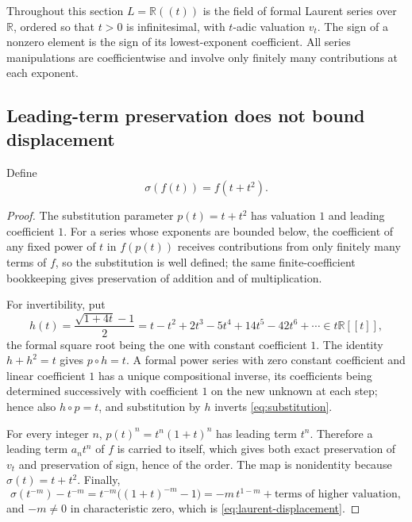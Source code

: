 \documentclass[11pt]{article}
\newtheorem{proposition}[theorem]{Proposition}
\theoremstyle{definition}
\theoremstyle{remark}
\newcommand{\R}{\mathbb{R}}
\numberwithin{equation}{section}
\begin{document}
Throughout this section $L=\R((t))$ is the field of formal Laurent series
over $\R$, ordered so that $t>0$ is infinitesimal, with $t$-adic valuation
$v_t$. The sign of a nonzero element is the sign of its lowest-exponent
coefficient. All series manipulations are coefficientwise and involve only
finitely many contributions at each exponent.

\subsection{Leading-term preservation does not bound displacement}

Define
\begin{equation}\label{eq:substitution}
 \sigma(f(t))=f(t+t^2).
\end{equation}

\begin{proof}
The substitution parameter $p(t)=t+t^2$ has valuation $1$ and leading
coefficient $1$. For a series whose exponents are bounded below, the
coefficient of any fixed power of $t$ in $f(p(t))$ receives contributions
from only finitely many terms of $f$, so the substitution is well defined;
the same finite-coefficient bookkeeping gives preservation of addition and
of multiplication.

For invertibility, put
\[
 h(t)=\frac{\sqrt{1+4t}-1}{2}
 =t-t^2+2t^3-5t^4+14t^5-42t^6+\cdots\in t\R[[t]],
\]
the formal square root being the one with constant coefficient $1$. The
identity $h+h^2=t$ gives $p\circ h=t$. A formal power series with zero
constant coefficient and linear coefficient $1$ has a unique compositional
inverse, its coefficients being determined successively with coefficient
$1$ on the new unknown at each step; hence also $h\circ p=t$, and
substitution by $h$ inverts \eqref{eq:substitution}.

For every integer $n$, $p(t)^n=t^n(1+t)^n$ has leading term $t^n$.
Therefore a leading term $a_nt^n$ of $f$ is carried to itself, which gives
both exact preservation of $v_t$ and preservation of sign, hence of the
order. The map is nonidentity because $\sigma(t)=t+t^2$. Finally,
\[
 \sigma(t^{-m})-t^{-m}=t^{-m}\bigl((1+t)^{-m}-1\bigr)
 =-m\,t^{1-m}+\text{terms of higher valuation},
\]
and $-m\ne0$ in characteristic zero, which is \eqref{eq:laurent-displacement}.
\end{proof}
\end{document}
